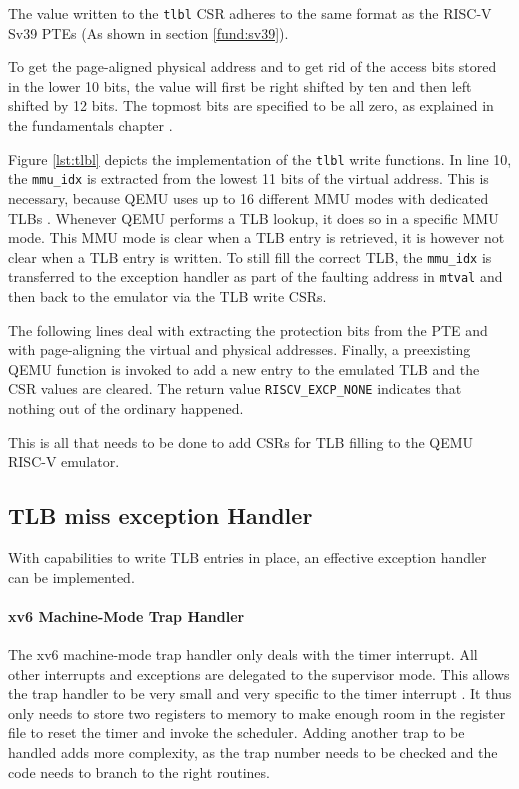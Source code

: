 The value written to the \texttt{tlbl} CSR adheres to the same format as the RISC-V Sv39 PTEs (As shown in section \ref{fund:sv39}).

To get the page-aligned physical address and to get rid of the access bits stored in the lower 10 bits,
the value will first be right shifted by ten and then left shifted by 12 bits.
The topmost bits are specified to be all zero, as explained in the fundamentals chapter \cite{RISCVInstructionSet}.

Figure \ref{lst:tlbl} depicts the implementation of the \texttt{tlbl} write functions.
In line 10, the \texttt{mmu\_idx} is extracted from the lowest 11 bits of the virtual address. This is
necessary, because QEMU uses up to 16 different MMU modes with dedicated TLBs \cite{QEMUSource2024}.
Whenever QEMU performs a TLB lookup, it does so in a specific MMU mode. This MMU mode is clear when
a TLB entry is retrieved, it is however not clear when a TLB entry is written.
To still fill the correct TLB, the \texttt{mmu\_idx} is transferred to the exception handler as part
of the faulting address in \texttt{mtval} and then back to the emulator via the TLB write CSRs.

The following lines deal with extracting the protection bits from the PTE and with page-aligning
the virtual and physical addresses. Finally, a preexisting QEMU function is invoked to add
a new entry to the emulated TLB and the CSR values are cleared.
The return value \texttt{RISCV\_EXCP\_NONE} indicates that nothing out of the ordinary happened.

This is all that needs to be done to add CSRs for TLB filling to the QEMU RISC-V emulator.





\subsection{TLB miss exception Handler}
With capabilities to write TLB entries in place, an effective exception handler can be implemented.

\paragraph{xv6 Machine-Mode Trap Handler} The xv6 machine-mode trap handler only deals
with the timer interrupt. All other interrupts and exceptions are delegated to the supervisor
mode. This allows the trap handler to be very small and very specific to the timer interrupt \cite{cox2011xv6}.
It thus only needs to store two registers to memory to make enough room in the register file
to reset the timer and invoke the scheduler.
Adding another trap to be handled adds more complexity, as the trap number needs to be checked
and the code needs to branch to the right routines.

